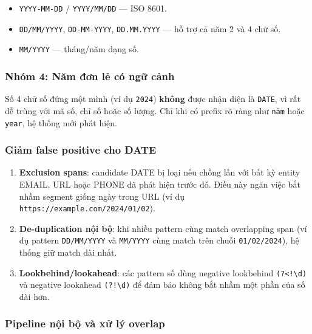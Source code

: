 \begin{itemize}[nosep]
    \item \texttt{YYYY-MM-DD} / \texttt{YYYY/MM/DD} --- ISO 8601.
    \item \texttt{DD/MM/YYYY}, \texttt{DD-MM-YYYY}, \texttt{DD.MM.YYYY} ---
          hỗ trợ cả năm 2 và 4 chữ số.
    \item \texttt{MM/YYYY} --- tháng/năm dạng số.
\end{itemize}

\subsubsection*{Nhóm 4: Năm đơn lẻ có ngữ cảnh}

Số 4 chữ số đứng một mình (ví dụ \texttt{2024}) \textbf{không} được nhận diện
là \texttt{DATE}, vì rất dễ trùng với mã số, chỉ số hoặc số lượng. Chỉ khi có
prefix rõ ràng như \texttt{năm} hoặc \texttt{year}, hệ thống mới phát hiện.

\subsubsection*{Giảm false positive cho DATE}

\begin{enumerate}[nosep]
    \item \textbf{Exclusion spans}: candidate DATE bị loại nếu chồng lấn với
          bất kỳ entity EMAIL, URL hoặc PHONE đã phát hiện trước đó. Điều
          này ngăn việc bắt nhầm segment giống ngày trong URL
          (ví dụ \texttt{https://example.com/2024/01/02}).
    \item \textbf{De-duplication nội bộ}: khi nhiều pattern cùng match
          overlapping span (ví dụ pattern \texttt{DD/MM/YYYY} và
          \texttt{MM/YYYY} cùng match trên chuỗi \texttt{01/02/2024}), hệ
          thống giữ match dài nhất.
    \item \textbf{Lookbehind/lookahead}: các pattern số dùng negative lookbehind
          \verb|(?<!\d)| và negative lookahead \verb|(?!\d)| để đảm bảo
          không bắt nhầm một phần của số dài hơn.
\end{enumerate}

\subsubsection{Pipeline nội bộ và xử lý overlap}
\label{sec:regex_pipeline}

